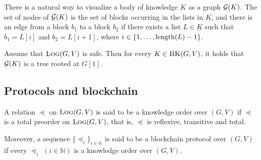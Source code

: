 There is a natural way to  visualize a body of knowledge $K$ as a graph $\mathcal{G}(K)$. The set of nodes of $\mathcal{G}(K)$ is the set of blocks occurring in the lists in $K$, and there is an edge from a block $b_1$ to a block $b_2$ if there exists a list $L \in K$ such that $b_1 = L[i]$ and $b_2 = L[i+1]$, where $i \in \{1, \ldots, \text{\rm length}(L) -1\}$.
\begin{mylem}
	Assume that $\text{\sc Log}(G,V)$ is safe. Then for every $K \in \text{\sc BK}(G,V)$, it holds that $\mathcal{G}(K)$ is a tree rooted at $G[1]$.
\end{mylem}

%



\subsection{Protocols and blockchain}

\begin{mydef}
	A relation $\preceq$ on $\text{\sc Log}(G,V)$ is said to be a knowledge order over $(G,V)$ if $\preceq$ is a total preorder on $\text{\sc Log}(G,V)$, that is, $\preceq$ is reflexive, transitive and total.
	
	Moreover, a sequence $\{ \preceq_i\}_{i \in \mathbb{N}}$ is said to be a blockchain protocol over $(G,V)$ if every $\preceq_i$ $(i \in \mathbb{N})$ is a knowledge order over $(G,V)$.
\end{mydef}



